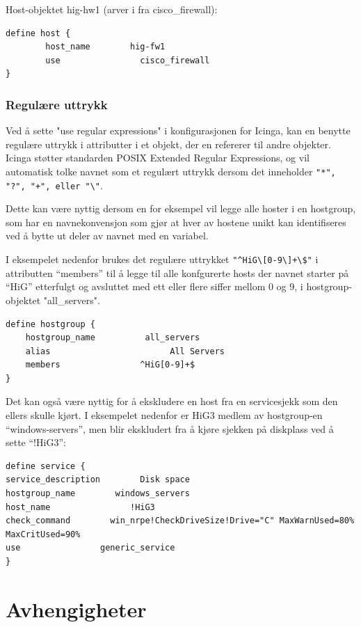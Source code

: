 Host-objektet hig-hw1 (arver i fra cisco\_firewall):

\begin{lstlisting}
define host {
        host_name        hig-fw1
        use                cisco_firewall
}
\end{lstlisting}

\subsubsection{Regulære uttrykk}
Ved å sette "use regular expressions" i konfigurasjonen for Icinga, kan en benytte regulære uttrykk i attributter i et objekt, der en refererer til andre objekter. Icinga støtter standarden POSIX Extended Regular Expressions, og vil automatisk tolke navnet som et regulært uttrykk dersom det inneholder \verb|"*", "?", "+", eller "\"|.

Dette kan være nyttig dersom en for eksempel vil legge alle hoster i en hostgroup, som har en navnekonvensjon som gjør at hver av hostene unikt kan identifiseres ved å bytte ut deler av navnet med en variabel.

I eksempelet nedenfor brukes det regulære uttrykket \verb|"^HiG\[0-9\]+\$"| i attributten “members” til å legge til alle konfgurerte hosts der navnet starter på “HiG” etterfulgt og avsluttet med ett eller flere siffer mellom 0 og 9, i hostgroup-objektet "all\_servers".

\begin{lstlisting}
define hostgroup {
	hostgroup_name          all_servers
	alias                        All Servers
	members                ^HiG[0-9]+$
}
\end{lstlisting}

Det kan også være nyttig for å ekskludere en host fra en servicesjekk som den ellers skulle kjørt. I eksempelet nedenfor er HiG3 medlem av hostgroup-en “windows-servers”, men blir ekskludert fra å kjøre sjekken på diskplass ved å sette “!HiG3”:

\begin{lstlisting}
define service {
service_description        Disk space
hostgroup_name        windows_servers
host_name                !HiG3
check_command        win_nrpe!CheckDriveSize!Drive="C" MaxWarnUsed=80% MaxCritUsed=90%
use                generic_service
}
\end{lstlisting}

\section{Avhengigheter}

